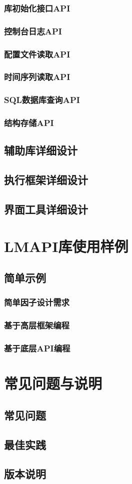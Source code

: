 \documentclass[10pt, a4paper]{book}
\begin{document}
        \section{库初始化接口API}
        \section{控制台日志API}
        \section{配置文件读取API}
        \section{时间序列读取API}
        \section{SQL数据库查询API}
        \section{结构存储API}
    \chapter{辅助库详细设计}
    \chapter{执行框架详细设计}
    \chapter{界面工具详细设计}
\part[用例]{LMAPI库使用样例}
    \chapter{简单示例}
        \section{简单因子设计需求}
        \section{基于高层框架编程}
        \section{基于底层API编程}
\part[FAQ]{常见问题与说明}
    \chapter{常见问题}
    \chapter{最佳实践}
    \chapter{版本说明}
\end{document}
